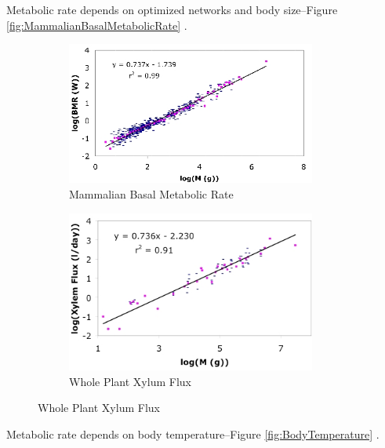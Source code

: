 \documentclass[]{article}
\begin{document}
Metabolic rate depends on optimized networks and body size--Figure \ref {fig:MammalianBasalMetabolicRate} \cite{savage2004predominance}.

\begin{figure}[H]
	\caption{Metabolic rate depends on optimized networks and body size}\label{fig:MammalianBasalMetabolicRate}
	\begin{subfigure}[p]{0.45\textwidth}
		\caption{Mammalian Basal Metabolic Rate}
		\includegraphics[width=0.9\textwidth]{MammalianBasalMetabolicRate}
	\end{subfigure}
	\begin{subfigure}[p]{0.45\textwidth}
		\caption{Whole Plant Xylum Flux}
		\includegraphics[width=0.9\textwidth]{WholePlantXylumFlux}
	\end{subfigure}
\end{figure}

Metabolic rate depends on body temperature--Figure \ref{fig:BodyTemperature} \cite{dell2011systematic}.
\end{document}
